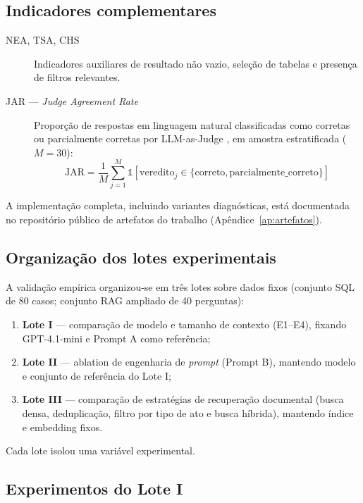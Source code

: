 \subsection{Indicadores complementares}

\begin{description}
    \item[NEA, TSA, CHS] Indicadores auxiliares de resultado não vazio, seleção de tabelas e presença de filtros relevantes.
    \item[JAR --- \textit{Judge Agreement Rate}] Proporção de respostas em linguagem natural classificadas como corretas ou parcialmente corretas por LLM-as-Judge \cite{Zheng2023LLMJudge}, em amostra estratificada ($M = 30$):
    \begin{equation}
    \text{JAR} = \frac{1}{M} \sum_{j=1}^{M} \mathbb{1}\!\left[\text{veredito}_j \in \{\text{correto}, \text{parcialmente\_correto}\}\right]
    \end{equation}
\end{description}

A implementação completa, incluindo variantes diagnósticas, está documentada no repositório público de artefatos do trabalho (Apêndice~\ref{ap:artefatos}).

\subsection{Organização dos lotes experimentais}

A validação empírica organizou-se em três lotes sobre dados fixos (conjunto SQL de 80 casos; conjunto RAG ampliado de 40 perguntas):

\begin{enumerate}
    \item \textbf{Lote I} --- comparação de modelo e tamanho de contexto (E1--E4), fixando GPT-4.1-mini e Prompt A como referência;
    \item \textbf{Lote II} --- ablation de engenharia de \textit{prompt} (Prompt B), mantendo modelo e conjunto de referência do Lote I;
    \item \textbf{Lote III} --- comparação de estratégias de recuperação documental (busca densa, deduplicação, filtro por tipo de ato e busca híbrida), mantendo índice e embedding fixos.
\end{enumerate}

Cada lote isolou uma variável experimental.

\subsection{Experimentos do Lote I}

